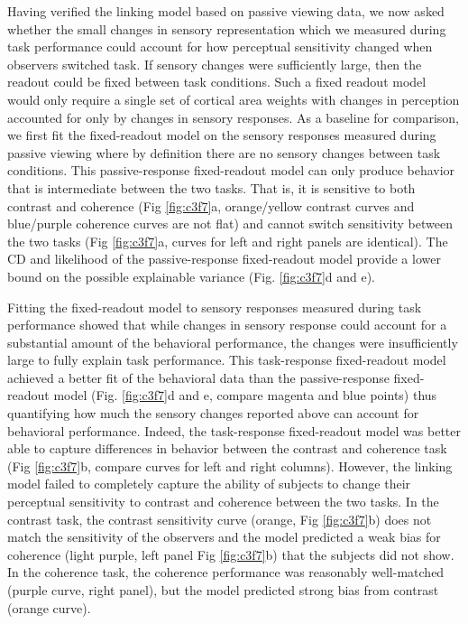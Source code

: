 Having verified the linking model based on passive viewing data, we now asked whether the small changes in sensory representation which we measured during task performance could account for how perceptual sensitivity changed when observers switched task. If sensory changes were sufficiently large, then the readout could be fixed between task conditions. Such a fixed readout model would only require a single set of cortical area weights with changes in perception accounted for only by changes in sensory responses. 
As a baseline for comparison, we first fit the fixed-readout model on the sensory responses measured during passive viewing where by definition there are no sensory changes between task conditions. This passive-response fixed-readout model can only produce behavior that is intermediate between the two tasks. That is, it is sensitive to both contrast and coherence (Fig \ref{fig:c3f7}a, orange/yellow contrast curves and blue/purple coherence curves are not flat) and cannot switch sensitivity between the two tasks (Fig \ref{fig:c3f7}a, curves for left and right panels are identical). The CD and likelihood of the passive-response fixed-readout model provide a lower bound on the possible explainable variance (Fig. \ref{fig:c3f7}d and e). 

Fitting the fixed-readout model to sensory responses measured during task performance showed that while changes in sensory response could account for a substantial amount of the behavioral performance, the changes were insufficiently large to fully explain task performance. This task-response fixed-readout model achieved a better fit of the behavioral data than the passive-response fixed-readout model (Fig. \ref{fig:c3f7}d and e, compare magenta and blue points) thus quantifying how much the sensory changes reported above can account for behavioral performance. Indeed, the task-response fixed-readout model was better able to capture differences in behavior between the contrast and coherence task (Fig \ref{fig:c3f7}b, compare curves for left and right columns). However, the linking model failed to completely capture the ability of subjects to change their perceptual sensitivity to contrast and coherence between the two tasks. In the contrast task, the contrast sensitivity curve (orange, Fig \ref{fig:c3f7}b) does not match the sensitivity of the observers and the model predicted a weak bias for coherence (light purple, left panel Fig \ref{fig:c3f7}b) that the subjects did not show. In the coherence task, the coherence performance was reasonably well-matched (purple curve, right panel), but the model predicted strong bias from contrast (orange curve).

